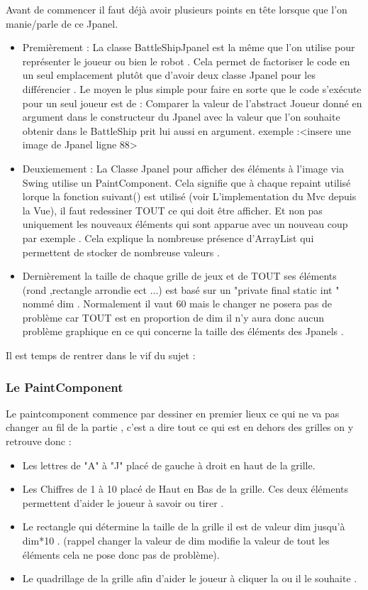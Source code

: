 \documentclass[a4paper,12pt]{article} %
\begin{document}
Avant de commencer il faut déjà avoir plusieurs points en tête lorsque que l'on manie/parle de ce Jpanel.
\begin{itemize}
\item Premièrement : La classe BattleShipJpanel est la même que l'on utilise pour représenter le joueur ou bien le robot .
Cela permet de factoriser le code en un seul emplacement plutôt que d'avoir deux classe Jpanel pour les différencier .
Le moyen le plus simple pour faire en sorte que le code s’exécute pour un seul joueur est de : 
Comparer la valeur de l'abstract Joueur donné en argument dans le constructeur du Jpanel avec la valeur que l'on souhaite obtenir dans le BattleShip prit lui aussi en argument.
exemple :<insere une image de Jpanel ligne 88>
\item Deuxiemement : La Classe Jpanel pour afficher des éléments à l'image via Swing utilise un PaintComponent.
Cela signifie que à chaque repaint utilisé lorque la fonction suivant() est utilisé (voir L'implementation du Mvc depuis la Vue), il faut redessiner TOUT ce qui doit être afficher.
Et non pas uniquement les nouveaux éléments qui sont apparue avec un nouveau coup par exemple .
Cela explique la nombreuse présence d'ArrayList qui permettent de stocker de nombreuse valeurs .
\item Dernièrement la taille de chaque grille de jeux et de TOUT ses éléments (rond ,rectangle arrondie ect ...) est basé sur un "private final static int " nommé dim .
Normalement il vaut 60 mais le changer ne posera pas de problème car TOUT est en proportion de dim il n'y aura donc aucun problème graphique en ce qui concerne la taille des éléments des Jpanels .
\end{itemize}

Il est temps de rentrer dans le vif du sujet :

\subsubsection{Le PaintComponent}
Le paintcomponent commence par dessiner en premier lieux ce qui ne va pas changer au fil de la partie  , c'est a dire tout ce qui est en dehors des grilles on y retrouve donc :
\begin{itemize}
\item Les lettres de "A" à "J" placé de gauche à droit en haut de la grille. 
\item Les Chiffres de 1 à 10 placé de Haut en Bas de la grille.
Ces deux éléments permettent d'aider le joueur à savoir ou tirer .
\item Le rectangle qui détermine la taille de la grille il est de valeur dim jusqu’à dim*10 . (rappel changer la valeur de dim modifie la valeur de tout les éléments cela ne pose donc pas de problème).
\item Le quadrillage de la grille afin d'aider le joueur à cliquer la ou il le souhaite .
\end{itemize}
\end{document}
